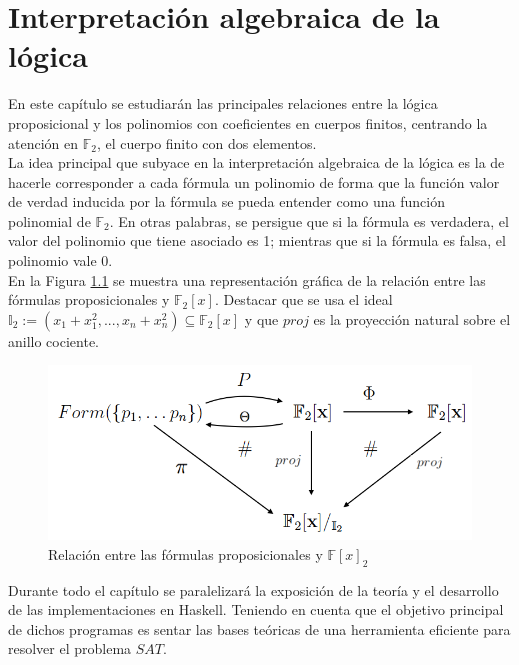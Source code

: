 \chapter{Interpretación algebraica de la lógica}\label{sec:interp}

En este capítulo se estudiarán las principales relaciones entre la lógica proposicional y los 
polinomios con coeficientes en cuerpos finitos, centrando la atención en $\mathbb{F}_2$, 
el cuerpo finito con dos elementos.\\

La idea principal que subyace en la interpretación algebraica de la lógica es la de hacerle corresponder a cada fórmula un polinomio de forma que la función valor de verdad inducida por la fórmula se pueda entender como una función polinomial de $\mathbb{F}_2$. En otras palabras, se persigue que si la fórmula es verdadera, el valor del polinomio que tiene asociado es 1; mientras que si la fórmula es falsa, el polinomio vale 0.\\

En la Figura \ref{fig:esquema} se muestra una representación gráfica de la relación entre las fórmulas proposicionales y $\mathbb{F}_2[x]$. Destacar que se usa el ideal $\mathbb{I}_2 :=(x_1+x_1^2,...,x_n+x_n^2)\subseteq\mathbb{F}_2[x]$ y que $proj$ es la proyección natural sobre el anillo cociente.

\begin{figure}[h]
	\centering
		\includegraphics[scale=0.46]{imagenes/conmu.png}
	\caption{Relación entre las fórmulas proposicionales y $\mathbb{F}[x]_2$}
	\label{fig:esquema}
\end{figure}

Durante todo el capítulo se paralelizará la exposición de la teoría y el desarrollo de las implementaciones en Haskell. Teniendo en cuenta que el objetivo principal de dichos programas es sentar las bases teóricas de una herramienta eficiente para resolver el problema $SAT$.
\newpage 
 
